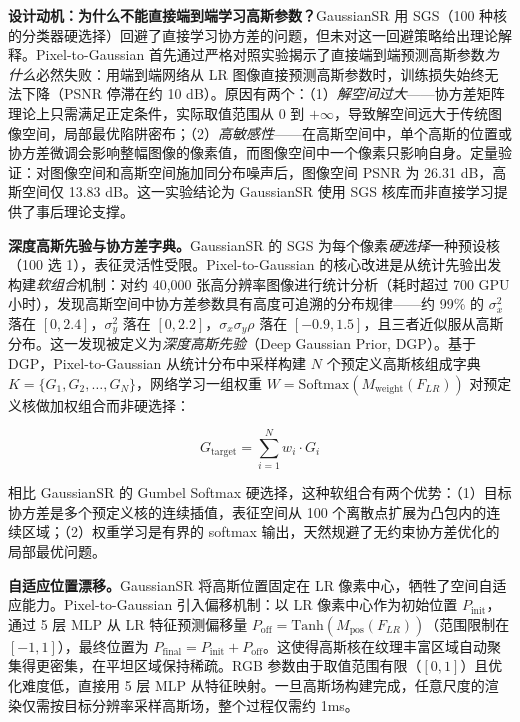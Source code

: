 \textbf{设计动机：为什么不能直接端到端学习高斯参数？}GaussianSR 用 SGS（100 种核的分类器硬选择）回避了直接学习协方差的问题，但未对这一回避策略给出理论解释。Pixel-to-Gaussian 首先通过严格对照实验揭示了直接端到端预测高斯参数\emph{为什么}必然失败：用端到端网络从 LR 图像直接预测高斯参数时，训练损失始终无法下降（PSNR 停滞在约 10 dB）。原因有两个：（1）\emph{解空间过大}——协方差矩阵理论上只需满足正定条件，实际取值范围从 $0$ 到 $+\infty$，导致解空间远大于传统图像空间，局部最优陷阱密布；（2）\emph{高敏感性}——在高斯空间中，单个高斯的位置或协方差微调会影响整幅图像的像素值，而图像空间中一个像素只影响自身。定量验证：对图像空间和高斯空间施加同分布噪声后，图像空间 PSNR 为 26.31 dB，高斯空间仅 13.83 dB。这一实验结论为 GaussianSR 使用 SGS 核库而非直接学习提供了事后理论支撑。

\textbf{深度高斯先验与协方差字典。}GaussianSR 的 SGS 为每个像素\emph{硬选择}一种预设核（100 选 1），表征灵活性受限。Pixel-to-Gaussian 的核心改进是从统计先验出发构建\emph{软组合}机制：对约 40,000 张高分辨率图像进行统计分析（耗时超过 700 GPU 小时），发现高斯空间中协方差参数具有高度可追溯的分布规律——约 99\% 的 $\sigma_x^2$ 落在 $[0, 2.4]$，$\sigma_y^2$ 落在 $[0, 2.2]$，$\sigma_x\sigma_y\rho$ 落在 $[-0.9, 1.5]$，且三者近似服从高斯分布。这一发现被定义为\emph{深度高斯先验}（Deep Gaussian Prior, DGP）。基于 DGP，Pixel-to-Gaussian 从统计分布中采样构建 $N$ 个预定义高斯核组成字典 $K = \{G_1, G_2, \ldots, G_N\}$，网络学习一组权重 $W = \text{Softmax}(M_{\text{weight}}(F_{LR}))$ 对预定义核做加权组合而非硬选择：

\begin{equation}
    G_{\text{target}} = \sum_{i=1}^{N} w_i \cdot G_i
\end{equation}

相比 GaussianSR 的 Gumbel Softmax 硬选择，这种软组合有两个优势：（1）目标协方差是多个预定义核的连续插值，表征空间从 100 个离散点扩展为凸包内的连续区域；（2）权重学习是有界的 softmax 输出，天然规避了无约束协方差优化的局部最优问题。

\textbf{自适应位置漂移。}GaussianSR 将高斯位置固定在 LR 像素中心，牺牲了空间自适应能力。Pixel-to-Gaussian 引入偏移机制：以 LR 像素中心作为初始位置 $P_{\text{init}}$，通过 5 层 MLP 从 LR 特征预测偏移量 $P_{\text{off}} = \text{Tanh}(M_{\text{pos}}(F_{LR}))$（范围限制在 $[-1, 1]$），最终位置为 $P_{\text{final}} = P_{\text{init}} + P_{\text{off}}$。这使得高斯核在纹理丰富区域自动聚集得更密集，在平坦区域保持稀疏。RGB 参数由于取值范围有限（$[0, 1]$）且优化难度低，直接用 5 层 MLP 从特征映射。一旦高斯场构建完成，任意尺度的渲染仅需按目标分辨率采样高斯场，整个过程仅需约 1ms。

